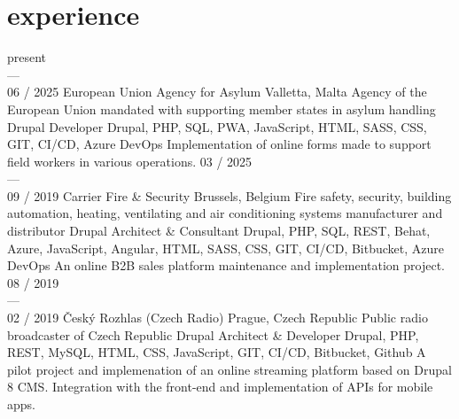 \documentclass[]{friggeri-cv} %
\begin{document}

    \bigskip


    \section{experience}
    \begin{entrylist}
        \job
        {present \\ --- \\ 06 / 2025}
        {European Union Agency for Asylum}
        {Valletta, Malta}
        {Agency of the European Union mandated with supporting member states in asylum handling}
        {
            \position
            {Drupal Developer}
            {Drupal, PHP, SQL, PWA, JavaScript, HTML, SASS, CSS, GIT, CI/CD, Azure DevOps}
            {
                Implementation of online forms made to support field workers in various operations.
            }
        }
        \job
        {03 / 2025 \\ --- \\ 09 / 2019}
        {Carrier Fire \& Security}
        {Brussels, Belgium}
        {Fire safety, security, building automation, heating, ventilating and air conditioning systems manufacturer and distributor}
        {
            \position
            {Drupal Architect \& Consultant}
            {Drupal, PHP, SQL, REST, Behat, Azure, JavaScript, Angular, HTML, SASS, CSS, GIT, CI/CD, Bitbucket, Azure DevOps}
            {
                An online B2B sales platform maintenance and implementation project.
            }
        }
        \job
        {08 / 2019 \\ --- \\ 02 / 2019}
        {Český Rozhlas (Czech Radio)}
        {Prague, Czech Republic}
        {Public radio broadcaster of Czech Republic}
        {
            \position
            {Drupal Architect \& Developer}
            {Drupal, PHP, REST, MySQL, HTML, CSS, JavaScript, GIT, CI/CD, Bitbucket, Github}
            {
                A pilot project and implemenation of an online streaming platform based on Drupal 8 CMS. Integration
                with the front-end and implementation of APIs for mobile apps.
            }
        }
    \end{entrylist}
\end{document}

